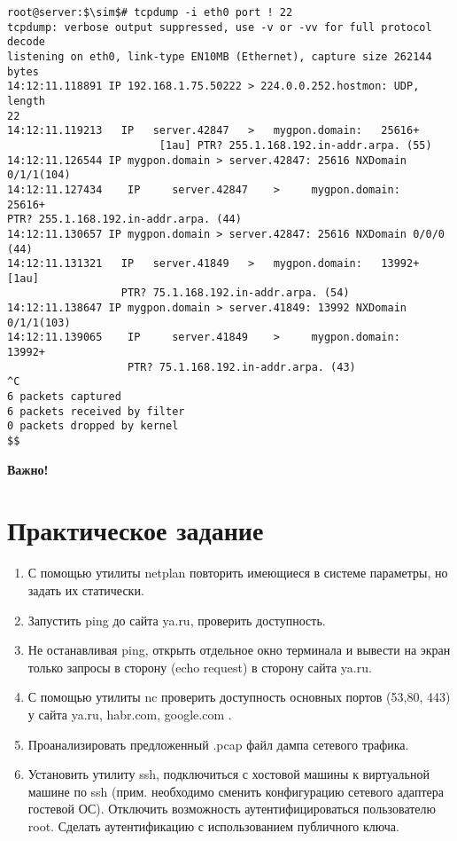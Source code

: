 \documentclass[14pt, a4paper]{article}
\begin{document}
\vspace{0.3cm}
\begin{lstlisting}
root@server:$\sim$# tcpdump -i eth0 port ! 22
tcpdump: verbose output suppressed, use -v or -vv for full protocol decode
listening on eth0, link-type EN10MB (Ethernet), capture size 262144 bytes
14:12:11.118891 IP 192.168.1.75.50222 > 224.0.0.252.hostmon: UDP, length
22
14:12:11.119213   IP   server.42847   >   mygpon.domain:   25616+
                        [1au] PTR? 255.1.168.192.in-addr.arpa. (55)
14:12:11.126544 IP mygpon.domain > server.42847: 25616 NXDomain 0/1/1(104)
14:12:11.127434    IP     server.42847    >     mygpon.domain:    25616+
PTR? 255.1.168.192.in-addr.arpa. (44)
14:12:11.130657 IP mygpon.domain > server.42847: 25616 NXDomain 0/0/0 (44)
14:12:11.131321   IP   server.41849   >   mygpon.domain:   13992+   [1au]
                  PTR? 75.1.168.192.in-addr.arpa. (54)
14:12:11.138647 IP mygpon.domain > server.41849: 13992 NXDomain 0/1/1(103)
14:12:11.139065    IP     server.41849    >     mygpon.domain:    13992+
                   PTR? 75.1.168.192.in-addr.arpa. (43)
^C
6 packets captured
6 packets received by filter
0 packets dropped by kernel
$$
\end{lstlisting}
\vspace{0.2cm}

\textbf{Важно!} \\

\newpage

\section*{Практическое задание} 

\begin{enumerate}
    \item С помощью утилиты netplan повторить имеющиеся в системе параметры, но задать их
    статически.
    \item Запустить ping до сайта ya.ru, проверить доступность.
    \item Не останавливая ping, открыть отдельное окно терминала и вывести на экран только запросы
    в сторону (echo request) в сторону сайта ya.ru.
    \item С помощью утилиты nc проверить доступность основных портов (53,80, 443) у сайта
    ya.ru, habr.com, google.com .
    \item Проанализировать предложенный .pcap файл дампа сетевого трафика.
    \item Установить утилиту ssh, подключиться с хостовой машины к виртуальной машине по ssh
    (прим. необходимо сменить конфигурацию сетевого адаптера гостевой ОС). Отключить
    возможность аутентифицироваться пользователю root. Сделать аутентификацию с
    использованием публичного ключа.
\end{enumerate}
\end{document}
